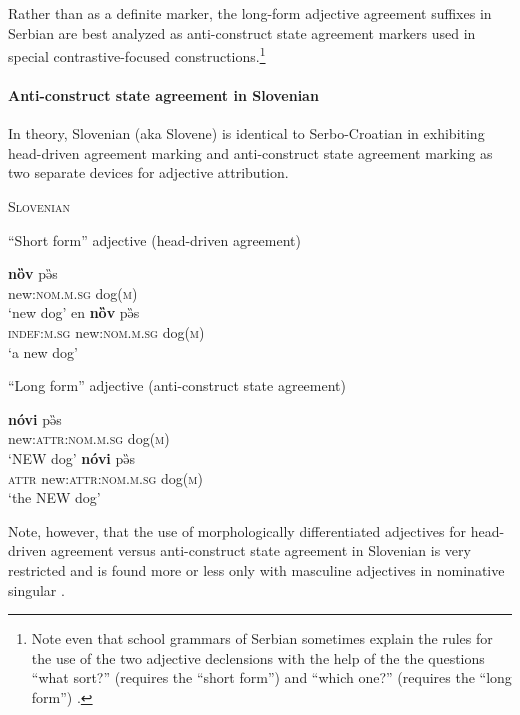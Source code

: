 Rather than as a definite marker, the long-form adjective agreement suffixes in Serbian are best analyzed as anti-construct state agreement markers used in special contrastive-focused constructions.\footnote{Note even that school grammars of Serbian sometimes explain the rules for the use of the two adjective declensions with the help of the the questions “what sort?” (requires the “short form”) and “which one?” (requires the “long form”) \cite[327]{browne1993}.}

\paragraph{Anti-construct state agreement in Slovenian}\label{slovenian synchr}
In theory, Slovenian (aka Slovene) is identical to Serbo-Croatian in exhibiting head-driven agreement marking and anti-construct state agreement marking as two separate devices for adjective attribution.
\begin{exe}
\ex \textsc{Slovenian} \citep[410]{priestly1993} \label{slov longshort}
\begin{xlist}
\ex “Short form” adjective (head-driven agreement)
\begin{xlist}
\ex
\gll 	\textbf{nȍv} pə̏s\\
	new:\textsc{nom.m.sg} dog\textsc{(m)}\\
\glt	‘new dog’
\ex	
\gll	en \textbf{nȍv} pə̏s\\
	\textsc{indef:m.sg} new:\textsc{nom.m.sg} dog\textsc{(m)}\\
\glt	‘a new dog’
\end{xlist}
\ex	“Long form” adjective (anti-construct state agreement)
\begin{xlist}
\ex	
\gll	\textbf{nóvi} pə̏s\\
	new:\textsc{attr:nom.m.sg} dog\textsc{(m)}\\
\glt	‘NEW dog’
\ex
{} \textbf{nóvi} pə̏s\\
	{\textsc{attr}} new:\textsc{attr:nom.m.sg} dog\textsc{(m)}\\
\glt	 ‘the NEW dog’
\end{xlist}
\end{xlist}
\end{exe}
Note, however, that the use of morphologically differentiated adjectives for head-driven agreement versus anti-construct state agreement in Slovenian is very restricted and is found more or less only with masculine adjectives in nominative singular \citep[410–411]{priestly1993}.

